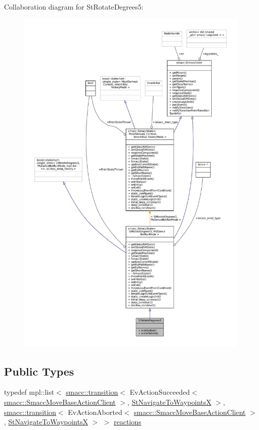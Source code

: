 Collaboration diagram for St\+Rotate\+Degrees5\+:
\nopagebreak
\begin{figure}[H]
\begin{center}
\leavevmode
\includegraphics[width=350pt]{structStRotateDegrees5__coll__graph}
\end{center}
\end{figure}
\subsection*{Public Types}
\begin{DoxyCompactItemize}
\item 
typedef mpl\+::list$<$ \hyperlink{classsmacc_1_1transition}{smacc\+::transition}$<$ Ev\+Action\+Succeeded$<$ \hyperlink{classsmacc_1_1SmaccMoveBaseActionClient}{smacc\+::\+Smacc\+Move\+Base\+Action\+Client} $>$, \hyperlink{structStNavigateToWaypointsX}{St\+Navigate\+To\+WaypointsX} $>$, \hyperlink{classsmacc_1_1transition}{smacc\+::transition}$<$ Ev\+Action\+Aborted$<$ \hyperlink{classsmacc_1_1SmaccMoveBaseActionClient}{smacc\+::\+Smacc\+Move\+Base\+Action\+Client} $>$, \hyperlink{structStNavigateToWaypointsX}{St\+Navigate\+To\+WaypointsX} $>$ $>$ \hyperlink{structStRotateDegrees5_a0551430b067639f0b803a001f98f76a9}{reactions}
\end{DoxyCompactItemize}
